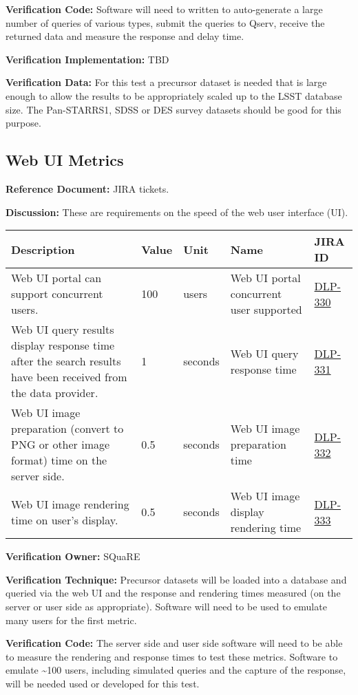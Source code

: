 \documentclass[DM,lsstdraft,toc]{lsstdoc}
\newcommand{\jira}[1]{\href{https://jira.lsstcorp.org/browse/#1}{#1}}
\begin{document}
\textbf{Verification Code:} Software will need to written to
auto-generate a large number of queries of various types, submit the
queries to Qserv, receive the returned data and measure the response and
delay time.

\textbf{Verification Implementation:} TBD

\textbf{Verification Data:} For this test a precursor dataset is needed
that is large enough to allow the results to be appropriately scaled up
to the LSST database size. The Pan-STARRS1, SDSS or DES survey datasets
should be good for this purpose.

\subsection{Web UI Metrics}\label{web-ui-metrics}

\textbf{Reference Document:} JIRA tickets.

\textbf{Discussion:} These are requirements on the speed of the web user
interface (UI).

\begin{longtable}[]{@{}p{}llp{1.5in}l@{}}
\toprule
Description & Value & Unit & Name & JIRA ID\tabularnewline
\midrule
\endhead
Web UI portal can support concurrent users. & 100 & users & Web UI
portal concurrent user supported & \jira{DLP-330}\tabularnewline
Web UI query results display response time after the search results have
been received from the data provider. & 1 & seconds & Web UI query
response time & \jira{DLP-331}\tabularnewline
Web UI image preparation (convert to PNG or other image format) time on
the server side. & 0.5 & seconds & Web UI image preparation time &
\jira{DLP-332}\tabularnewline
Web UI image rendering time on user's display. & 0.5 & seconds & Web UI
image display rendering time & \jira{DLP-333}\tabularnewline
\bottomrule
\end{longtable}

\textbf{Verification Owner:} SQuaRE

\textbf{Verification Technique:} Precursor datasets will be loaded into
a database and queried via the web UI and the response and rendering
times measured (on the server or user side as appropriate). Software
will need to be used to emulate many users for the first metric.

\textbf{Verification Code:} The server side and user side software will
need to be able to measure the rendering and response times to test
these metrics. Software to emulate \textasciitilde{}100 users, including
simulated queries and the capture of the response, will be needed used
or developed for this test.
\end{document}
